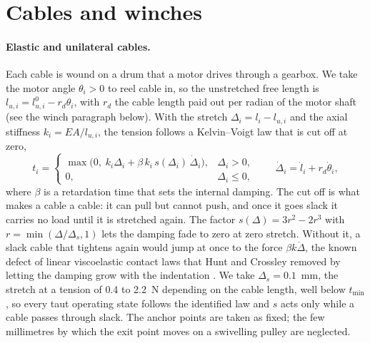 \documentclass[10pt]{article}
\begin{document}
\section{Cables and winches}\label{sec:cable}

\paragraph{Elastic and unilateral cables.} Each cable is wound on a drum that a motor drives through a gearbox. We take the motor angle $\theta_i>0$ to reel cable in, so the unstretched free length is $l_{u,i}=l_{u,i}^0-r_d\theta_i$, with $r_d$ the cable length paid out per radian of the motor shaft (see the winch paragraph below). With the stretch $\Delta_i=l_i-l_{u,i}$ and the axial stiffness $k_i=EA/l_{u,i}$, the tension follows a Kelvin--Voigt law that is cut off at zero,
\begin{equation}\label{eq:tension}
t_i=\begin{cases}\max\!\big(0,\;k_i\Delta_i+\beta\,k_i\,s(\Delta_i)\,\dot\Delta_i\big), & \Delta_i>0,\\ 0, & \Delta_i\le 0,\end{cases}
\qquad \dot\Delta_i=\dot l_i+r_d\dot\theta_i ,
\end{equation}
where $\beta$ is a retardation time that sets the internal damping. The cut off is what makes a cable a cable: it can pull but cannot push, and once it goes slack it carries no load until it is stretched again. The factor $s(\Delta)=3r^2-2r^3$ with $r=\min(\Delta/\Delta_s,1)$ lets the damping fade to zero at zero stretch. Without it, a slack cable that tightens again would jump at once to the force $\beta k\dot\Delta$, the known defect of linear viscoelastic contact laws that Hunt and Crossley removed by letting the damping grow with the indentation \citep{hunt1975coefficient}. We take $\Delta_s=0.1$~mm, the stretch at a tension of 0.4 to 2.2~N depending on the cable length, well below $t_{\min}$, so every taut operating state follows the identified law and $s$ acts only while a cable passes through slack. The anchor points are taken as fixed; the few millimetres by which the exit point moves on a swivelling pulley are neglected.
\end{document}
